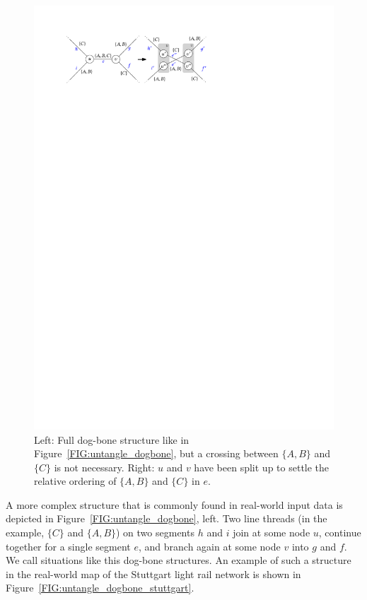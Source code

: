\documentclass[format=acmsmall, review=false, screen=true]{acmart}
\begin{document}
\begin{figure}
\centering
  \includegraphics[width=.7\textwidth, page=2]{untangling/dogbone.pdf}
  \caption{Left: Full dog-bone structure like in Figure~\ref{FIG:untangle_dogbone}, but a crossing between $\{A, B\}$ and $\{C\}$ is not necessary. Right: $u$ and $v$ have been split up to settle the relative ordering of $\{A, B\}$ and $\{C\}$ in $e$.}  
  \label{FIG:untangle_dogbone2}
\end{figure}

A more complex structure that is commonly found in real-world input data is depicted in Figure~\ref{FIG:untangle_dogbone}, left.
Two line threads (in the example, $\{C\}$ and $\{A, B\}$) on two segments $h$ and $i$ join at some node $u$, continue together for a single segment $e$, and branch again at some node $v$ into $g$ and $f$. We call situations like this dog-bone structures.
An example of such a structure in the real-world map of the Stuttgart light rail network is shown in Figure~\ref{FIG:untangle_dogbone_stuttgart}.
\end{document}
